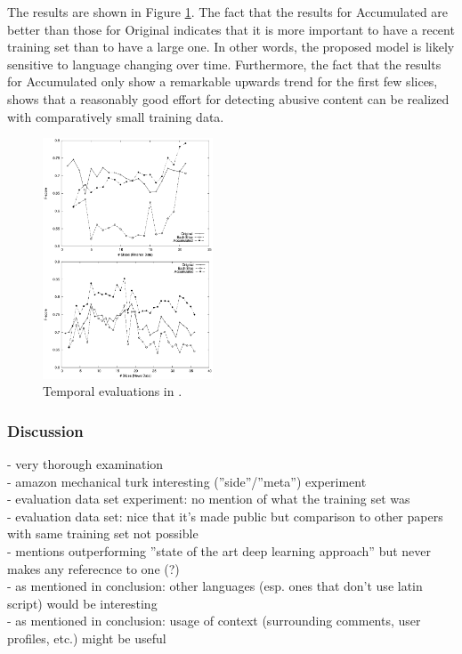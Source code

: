 \documentclass{proseminar}
\begin{document}
The results are shown in Figure \ref{fig:yahoo_temporal}. The fact that the results for Accumulated are better than those for Original indicates that it is more important to have a recent training set than to have a large one. In other words, the proposed model is likely sensitive to language changing over time. Furthermore, the fact that the results for Accumulated only show a remarkable upwards trend for the first few slices, shows that a reasonably good effort for detecting abusive content can be realized with comparatively small training data.

\begin{figure}
\centering
\includegraphics[width=0.45\textwidth]{img/yahoo_temporal}
\caption{Temporal evaluations in \cite{Yahoo:2016}.}
\label{fig:yahoo_temporal}
\end{figure}

\subsubsection{Discussion}
- very thorough examination\\
- amazon mechanical turk interesting (''side''/''meta'') experiment\\
- evaluation data set experiment: no mention of what the training set was\\
- evaluation data set: nice that it's made public but comparison to other papers with same training set not possible\\
- mentions outperforming ''state of the art deep learning approach'' but never makes any referecnce to one (?)\\
- as mentioned in conclusion: other languages (esp. ones that don't use latin script) would be interesting\\
- as mentioned in conclusion: usage of context (surrounding comments, user profiles, etc.) might be useful
\end{document}

